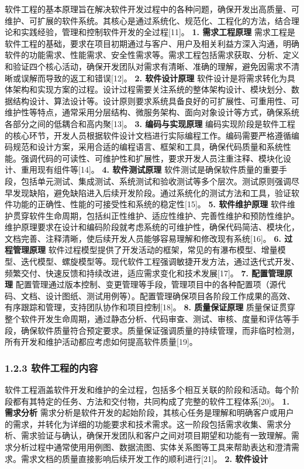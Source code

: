 软件工程的基本原理旨在解决软件开发过程中的各种问题，确保开发出高质量、可维护、可扩展的软件系统。其核心是通过系统化、规范化、工程化的方法，结合理论和实践经验，管理和控制软件开发的全过程{[}11{]}。 \textbf{1. 需求工程原理} 需求工程是软件工程的基础，要求在项目初期通过与客户、用户及相关利益方深入沟通，明确软件的功能需求、性能需求、安全性需求等。需求工程包括需求获取、分析、定义和验证四个核心活动，确保开发团队对需求有清晰、准确的理解，避免因需求不清晰或误解而导致的返工和错误{[}12{]}。 \textbf{2. 软件设计原理} 软件设计是将需求转化为具体架构和实现方案的过程。设计过程需要关注系统的整体架构设计、模块划分、数据结构设计、算法设计等。设计原则要求系统具备良好的可扩展性、可重用性、可维护性等特点，通常采用分层结构、微服务架构、面向对象设计等方式，确保系统各部分之间的低耦合和高内聚{[}13{]}。 \textbf{3. 编码与实现原理} 编码实现阶段是软件工程的核心环节，开发人员根据软件设计文档进行实际编程工作。编码需要严格遵循编码规范和设计方案，采用合适的编程语言、框架和工具，确保代码质量和系统性能。强调代码的可读性、可维护性和扩展性，要求开发人员注重注释、模块化设计、重用现有组件等{[}14{]}。 \textbf{4. 软件测试原理} 软件测试是确保软件质量的重要手段，包括单元测试、集成测试、系统测试和验收测试等多个层次。测试原则强调尽早发现缺陷，避免缺陷进入后续开发阶段。通过系统化的测试方法和工具，验证软件功能的正确性、性能的可接受性和系统的稳定性{[}15{]}。 \textbf{5. 软件维护原理} 软件维护贯穿软件生命周期，包括纠正性维护、适应性维护、完善性维护和预防性维护。维护原理要求在设计和编码阶段就考虑系统的可维护性，确保代码简洁、模块化，文档完善、注释清晰，使后续开发人员能够容易理解和修改现有系统{[}16{]}。 \textbf{6. 过程管理原理} 软件过程模型提供了开发活动的框架，常见的有瀑布模型、增量模型、迭代模型、螺旋模型等。现代软件工程强调敏捷开发方法，通过迭代式开发、频繁交付、快速反馈和持续改进，适应需求变化和技术发展{[}17{]}。 \textbf{7. 配置管理原理} 配置管理通过版本控制、变更管理等手段，管理项目中的各种配置项（源代码、文档、设计图纸、测试用例等）。配置管理确保项目各阶段工作成果的高效、有序跟踪和管理，支持团队协作和项目控制{[}18{]}。 \textbf{8. 质量保证原理} 质量保证贯穿整个软件开发生命周期，通过静态分析、代码审查、测试、审核、度量和评估等手段，确保软件质量符合预定要求。质量保证强调质量的持续管理，而非临时检测，所有开发和维护活动都应考虑如何提高软件质量{[}19{]}。 \subsubsection{1.2.3 软件工程的内容}\label{ux8f6fux4ef6ux5de5ux7a0bux7684ux5185ux5bb9} 软件工程涵盖软件开发和维护的全过程，包括多个相互关联的阶段和活动。每个阶段都有其特定的任务、方法和交付物，共同构成了完整的软件工程体系{[}20{]}。 \textbf{1. 需求分析} 需求分析是软件开发的起始阶段，其核心任务是理解和明确客户或用户的需求，并转化为详细的功能要求和技术需求。这一阶段包括需求收集、需求分析、需求验证与确认，确保开发团队和客户之间对项目期望和功能有一致理解。需求分析过程中通常使用用例图、数据流图、实体关系图等工具来帮助表达和澄清需求。需求文档的质量直接影响后续开发工作的顺利进行{[}21{]}。 \textbf{2. 软件设计} 